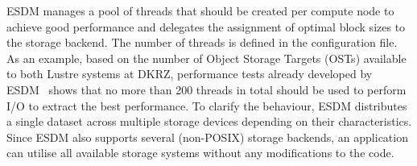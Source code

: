 \documentclass{superfri}
\newcommand{\jk}[1]{\todo[inline]{JK: #1}}
\newcommand{\lr}[1]{\textcolor{cyan}{LR: #1}}
\newcommand{\hh}[1]{\textcolor{blue}{HuangHua: #1}}
\newcommand{\bnl}[1]{\textcolor{green}{BNL: #1}}
\begin{document}


ESDM manages a pool of threads that should be created per compute node to achieve good performance and delegates the assignment of optimal block sizes to the storage backend.
The number of threads is defined in the configuration file.
As an example, based on the number of Object Storage Targets (OSTs) available to both Lustre systems at DKRZ, performance tests already developed by ESDM~\cite{2019_3361225} shows that no more than 200 threads in total should be used to perform I/O to extract the best performance.
To clarify the behaviour, ESDM distributes a single dataset across multiple storage devices depending on their characteristics.
Since ESDM also supports several (non-POSIX) storage backends, an application can utilise all available storage systems without any modifications to the code.

\end{document}
